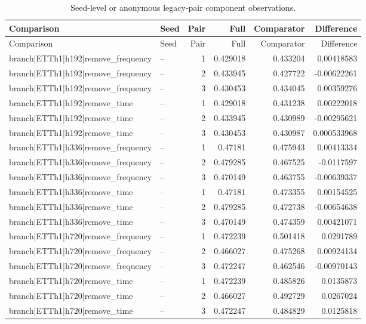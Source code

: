 \begin{longtable}{llrrrr}
\caption{Seed-level or anonymous legacy-pair component observations.}\\
\toprule
Comparison & Seed & Pair & Full & Comparator & Difference \\
\midrule
\endfirsthead
\toprule
Comparison & Seed & Pair & Full & Comparator & Difference \\
\midrule
\endhead
branch|ETTh1|h192|remove\_frequency & -- & 1 & 0.429018 & 0.433204 & 0.00418583 \\
branch|ETTh1|h192|remove\_frequency & -- & 2 & 0.433945 & 0.427722 & -0.00622261 \\
branch|ETTh1|h192|remove\_frequency & -- & 3 & 0.430453 & 0.434045 & 0.00359276 \\
branch|ETTh1|h192|remove\_time & -- & 1 & 0.429018 & 0.431238 & 0.00222018 \\
branch|ETTh1|h192|remove\_time & -- & 2 & 0.433945 & 0.430989 & -0.00295621 \\
branch|ETTh1|h192|remove\_time & -- & 3 & 0.430453 & 0.430987 & 0.000533968 \\
branch|ETTh1|h336|remove\_frequency & -- & 1 & 0.47181 & 0.475943 & 0.00413334 \\
branch|ETTh1|h336|remove\_frequency & -- & 2 & 0.479285 & 0.467525 & -0.0117597 \\
branch|ETTh1|h336|remove\_frequency & -- & 3 & 0.470149 & 0.463755 & -0.00639337 \\
branch|ETTh1|h336|remove\_time & -- & 1 & 0.47181 & 0.473355 & 0.00154525 \\
branch|ETTh1|h336|remove\_time & -- & 2 & 0.479285 & 0.472738 & -0.00654638 \\
branch|ETTh1|h336|remove\_time & -- & 3 & 0.470149 & 0.474359 & 0.00421071 \\
branch|ETTh1|h720|remove\_frequency & -- & 1 & 0.472239 & 0.501418 & 0.0291789 \\
branch|ETTh1|h720|remove\_frequency & -- & 2 & 0.466027 & 0.475268 & 0.00924134 \\
branch|ETTh1|h720|remove\_frequency & -- & 3 & 0.472247 & 0.462546 & -0.00970143 \\
branch|ETTh1|h720|remove\_time & -- & 1 & 0.472239 & 0.485826 & 0.0135873 \\
branch|ETTh1|h720|remove\_time & -- & 2 & 0.466027 & 0.492729 & 0.0267024 \\
branch|ETTh1|h720|remove\_time & -- & 3 & 0.472247 & 0.484829 & 0.0125818 \\

\end{longtable}
